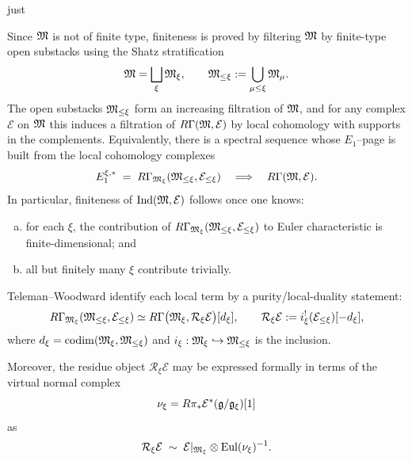 just \documentclass[12pt]{article}
\DeclareMathOperator{\Eul}{Eul}
\DeclareMathOperator{\Ind}{Ind}
\begin{document}
Since $\mathfrak{M}$ is not of finite type, finiteness is proved by filtering
$\mathfrak{M}$ by finite-type open substacks using the Shatz stratification
\[
\mathfrak{M}=\bigsqcup_{\xi}\mathfrak{M}_\xi,
\qquad
\mathfrak{M}_{\le \xi}:=\bigcup_{\mu\le\xi}\mathfrak{M}_\mu.
\]
The open substacks $\mathfrak{M}_{\le\xi}$ form an increasing filtration of $\mathfrak{M}$,
and for any complex $\mathcal E$ on $\mathfrak{M}$ this induces a filtration of
$R\Gamma(\mathfrak{M},\mathcal E)$ by local cohomology with supports in the complements.
Equivalently, there is a spectral sequence whose $E_1$--page is built from the
local cohomology complexes
\[
E_1^{\xi,*}\;=\;R\Gamma_{\mathfrak{M}_\xi}(\mathfrak{M}_{\le\xi},\mathcal E_{\le\xi})
\quad\Longrightarrow\quad
R\Gamma(\mathfrak{M},\mathcal E).
\]
In particular, finiteness of $\Ind(\mf M,\mathcal E)$ follows once one knows:
\begin{enumerate}[(a)]
\item for each $\xi$, the contribution of $R\Gamma_{\mathfrak{M}_\xi}(\mathfrak{M}_{\le\xi},\mathcal E_{\le\xi})$
to Euler characteristic is finite-dimensional; and
\item all but finitely many $\xi$ contribute trivially.
\end{enumerate}

Teleman--Woodward identify each local term by a purity/local-duality statement:
\[
R\Gamma_{\mathfrak{M}_\xi}(\mathfrak{M}_{\le\xi},\mathcal E_{\le\xi})
\simeq
R\Gamma\bigl(\mathfrak{M}_\xi,\mathcal R_\xi\mathcal E\bigr)[d_\xi],
\qquad
\mathcal R_\xi\mathcal E:= i_\xi^!(\mathcal E_{\le\xi})[-d_\xi],
\]
where $d_\xi=\operatorname{codim}(\mathfrak{M}_\xi,\mathfrak{M}_{\le\xi})$ and $i_\xi:\mathfrak{M}_\xi\hookrightarrow\mathfrak{M}_{\le\xi}$
is the inclusion.


Moreover, the residue object $\mathcal R_\xi\mathcal E$ may be expressed
formally in terms of the virtual normal complex
\[
\nu_\xi=R\pi_*\mathcal E^*(\mathfrak{g}/\mathfrak{g}_\xi)[1]
\]
as
\[
\mathcal R_\xi\mathcal E\;\sim\;
\mathcal E|_{\mf M_\xi}\otimes \Eul(\nu_\xi)^{-1}.
\]
\end{document}
